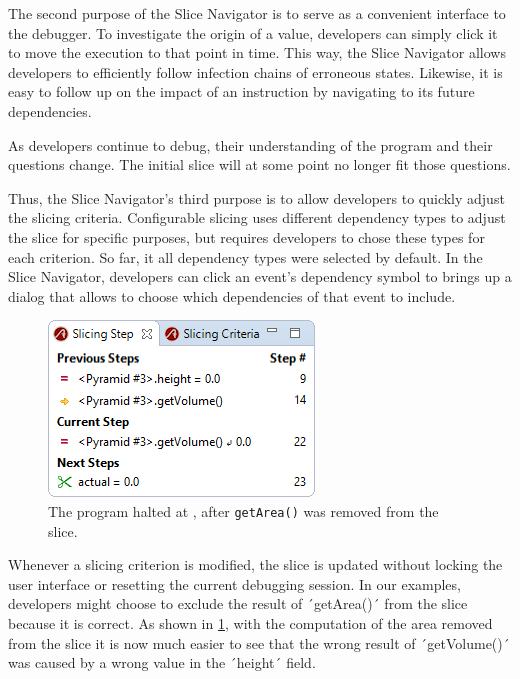\documentclass[
			english,
			]{elsarticle}
\begin{document}
The second purpose of the Slice Navigator is to serve as a convenient interface to the debugger.
To investigate the origin of a value, developers can simply click it to move the execution to that point in time.
This way, the Slice Navigator allows developers to efficiently follow infection chains of erroneous states.
Likewise, it is easy to follow up on the impact of an instruction by navigating to its future dependencies.

As developers continue to debug, their understanding of the program and their questions change.
The initial slice will at some point no longer fit those questions.

Thus, the Slice Navigator's third purpose is to allow developers to quickly adjust the slicing criteria.
Configurable slicing uses different dependency types to adjust the slice for specific purposes, but requires developers to chose these types for each criterion.
So far, it all dependency types were selected by default.
In the Slice Navigator, developers can click an event's dependency symbol to brings up a dialog that allows to choose which dependencies of that event to include.


\begin{figure}
	\centering
		\includegraphics[width=0.40\linewidth]{slice2.png}
	\caption{The program halted at , after \lstinline{getArea()} was removed from the slice.}
	\label{fig:slice2}
\end{figure}

Whenever a slicing criterion is modified, the slice is updated without locking the user interface or resetting the current debugging session.
In our examples, developers might choose to exclude the result of ´getArea()´ from the slice because it is correct.
As shown in \cref{fig:slice2}, with the computation of the area removed from the slice it is now much easier to see that the wrong result of ´getVolume()´ was caused by a wrong value in the ´height´ field.
\end{document}
